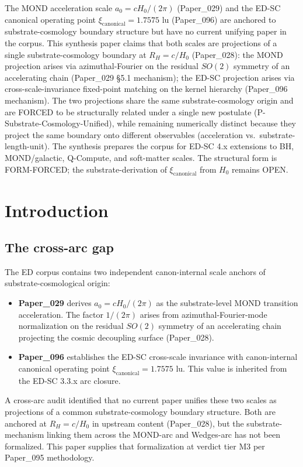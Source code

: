 \documentclass[11pt,a4paper]{article}
\begin{document}
The MOND acceleration scale $a_0 = cH_0/(2\pi)$ (Paper\_029) and the ED-SC canonical operating point $\xi_\mathrm{canonical} = 1.7575$ lu (Paper\_096) are anchored to substrate-cosmology boundary structure but have no current unifying paper in the corpus. This synthesis paper claims that both scales are projections of a single substrate-cosmology boundary at $R_H = c/H_0$ (Paper\_028): the MOND projection arises via azimuthal-Fourier on the residual $SO(2)$ symmetry of an accelerating chain (Paper\_029 \S5.1 mechanism); the ED-SC projection arises via cross-scale-invariance fixed-point matching on the kernel hierarchy (Paper\_096 mechanism). The two projections share the same substrate-cosmology origin and are FORCED to be structurally related under a single new postulate (P-Substrate-Cosmology-Unified), while remaining numerically distinct because they project the same boundary onto different observables (acceleration vs.\ substrate-length-unit). The synthesis prepares the corpus for ED-SC 4.x extensions to BH, MOND/galactic, Q-Compute, and soft-matter scales. The structural form is FORM-FORCED; the substrate-derivation of $\xi_\mathrm{canonical}$ from $H_0$ remains OPEN.

\section{Introduction}

\subsection{The cross-arc gap}

The ED corpus contains two independent canon-internal scale anchors of substrate-cosmological origin:

\begin{itemize}[noitemsep]
\item \textbf{Paper\_029} derives $a_0 = cH_0/(2\pi)$ as the substrate-level MOND transition acceleration. The factor $1/(2\pi)$ arises from azimuthal-Fourier-mode normalization on the residual $SO(2)$ symmetry of an accelerating chain projecting the cosmic decoupling surface (Paper\_028).
\item \textbf{Paper\_096} establishes the ED-SC cross-scale invariance with canon-internal canonical operating point $\xi_\mathrm{canonical} = 1.7575$ lu. This value is inherited from the ED-SC 3.3.x arc closure.
\end{itemize}

A cross-arc audit identified that no current paper unifies these two scales as projections of a common substrate-cosmology boundary structure. Both are anchored at $R_H = c/H_0$ in upstream content (Paper\_028), but the substrate-mechanism linking them across the MOND-arc and Wedges-arc has not been formalized. This paper supplies that formalization at verdict tier M3 per Paper\_095 methodology.
\end{document}

